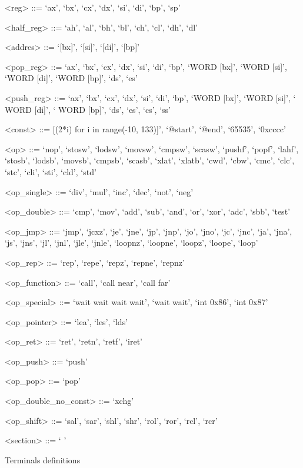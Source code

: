 \documentclass[dvipsnames, format=sigconf]{acmart}
\begin{document}
\begin{BNF}
\begin{framed}
\begin{grammar}
<reg> ::= `ax', `bx', `cx', `dx', `si', `di', `bp', `sp' 

<half\_reg> ::= `ah', `al', `bh', `bl', `ch', `cl', `dh', `dl'

<addres> ::= `[bx]', `[si]', `[di]', `[bp]'

<pop\_reg> ::= `ax', `bx', `cx', `dx', `si', `di', `bp', `WORD [bx]', `WORD [si]', `WORD [di]', `WORD [bp]', `ds', `es'

<push\_reg> ::= `ax', `bx', `cx', `dx', `si', `di', `bp', `WORD [bx]', `WORD [si]', ` WORD [di]', ` WORD [bp]', `ds', `es', `cs', `ss'

<const> ::= [(2*i) for i in range(-10, 133)]', `@start', `@end', `65535', `0xcccc'

<op> ::= `nop', `stosw', `lodsw', `movsw', `cmpsw', `scasw', `pushf', `popf', `lahf', `stosb', `lodsb', `movsb', `cmpsb', `scasb', `xlat', `xlatb', `cwd', `cbw', `cmc', `clc', `stc', `cli', `sti', `cld', `std'

<op\_single> ::= `div', `mul', `inc', `dec', `not', `neg'

<op\_double> ::= `cmp', `mov', `add', `sub', `and', `or', `xor', `adc', `sbb', `test'

<op\_jmp> ::= `jmp', `jcxz', `je', `jne', `jp', `jnp', `jo', `jno', `jc', `jnc', `ja', `jna', `js', `jns', `jl', `jnl', `jle', `jnle', `loopnz', `loopne', `loopz', `loope', `loop'

<op\_rep> ::= `rep', `repe', `repz', `repne', `repnz'

<op\_function> ::= `call', `call near', `call far'

<op\_special> ::= `wait wait wait wait', `wait wait', `int 0x86', `int 0x87'

<op\_pointer> ::= `lea', `les', `lds'

<op\_ret> ::= `ret', `retn', `retf', `iret'

<op\_push> ::= `push'

<op\_pop> ::= `pop'

<op\_double\_no\_const> ::= `xchg'

<op\_shift> ::= `sal', `sar', `shl', `shr', `rol', `ror', `rcl', `rcr'

<section> ::= ` ' 
\end{grammar}
\end{framed}\vspace{-1em}
\caption{Terminals definitions}\vspace{2em}
\label{tab:1_terminal_set}
\end{BNF}
\end{document}
